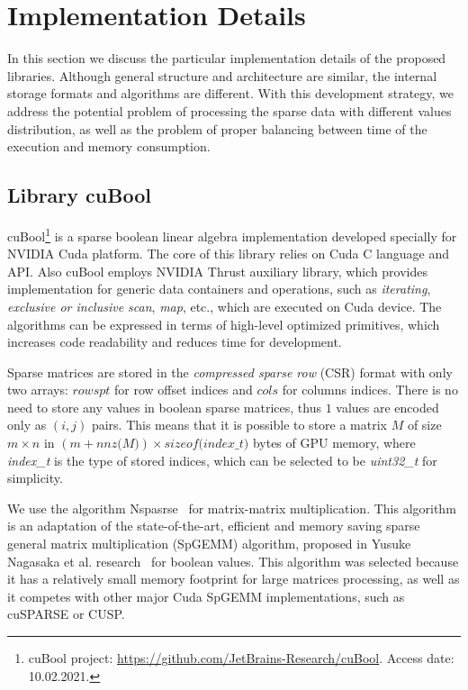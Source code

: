 \section{Implementation Details}

In this section we discuss the particular implementation details of the proposed libraries.
Although general structure and architecture are similar, the internal storage formats and algorithms are different.
With this development strategy, we address the potential problem of processing the sparse data with different values distribution, as well as the problem of proper balancing between time of the execution and memory consumption.

\subsection{Library cuBool}

cuBool\footnote{cuBool project: \url{https://github.com/JetBrains-Research/cuBool}. Access date: 10.02.2021.}
is a sparse boolean linear algebra implementation developed specially for NVIDIA Cuda platform.
The core of this library relies on Cuda C language and API.
Also cuBool employs NVIDIA Thrust auxiliary library, which provides implementation for generic data containers and operations, such as \textit{iterating}, \textit{exclusive or inclusive scan}, \textit{map}, etc., which are executed on Cuda device.
The algorithms can be expressed in terms of high-level optimized primitives, which increases code readability and reduces time for development.

Sparse matrices are stored in the \textit{compressed sparse row} (CSR) format with only two arrays: $rowspt$ for row offset indices and $cols$ for columns indices.
There is no need to store any values in boolean sparse matrices, thus $1$ values are encoded only as $(i, j)$ pairs.
This means that it is possible to store a matrix $M$ of size $m \times n$ in $(m + \textit{nnz(M)}) \times \textit{sizeof(index\_t)}$ bytes of GPU memory, where \textit{index\_t} is the type of stored indices, which can be selected to be \textit{uint32\_t} for simplicity.

We use the algorithm Nspasrse~\cite{inproceedings:cfpq_for_redis_graph} for matrix-matrix multiplication.
This algorithm is an adaptation of the state-of-the-art, efficient and memory saving sparse general matrix multiplication (SpGEMM) algorithm, proposed in Yusuke Nagasaka et al. research~\cite{algo:spgemm:8025284} for boolean values.
This algorithm was selected because it has a relatively small memory footprint for large matrices processing, as well as it competes with other major Cuda SpGEMM implementations, such as cuSPARSE or CUSP.

